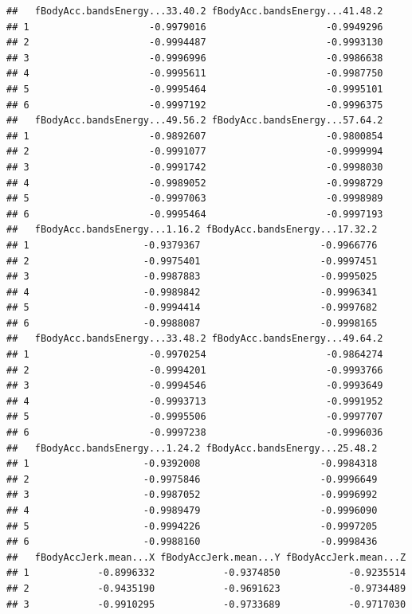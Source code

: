 \documentclass[
]{article}
\begin{document}
\begin{verbatim}
##   fBodyAcc.bandsEnergy...33.40.2 fBodyAcc.bandsEnergy...41.48.2
## 1                     -0.9979016                     -0.9949296
## 2                     -0.9994487                     -0.9993130
## 3                     -0.9996996                     -0.9986638
## 4                     -0.9995611                     -0.9987750
## 5                     -0.9995464                     -0.9995101
## 6                     -0.9997192                     -0.9996375
##   fBodyAcc.bandsEnergy...49.56.2 fBodyAcc.bandsEnergy...57.64.2
## 1                     -0.9892607                     -0.9800854
## 2                     -0.9991077                     -0.9999994
## 3                     -0.9991742                     -0.9998030
## 4                     -0.9989052                     -0.9998729
## 5                     -0.9997063                     -0.9998989
## 6                     -0.9995464                     -0.9997193
##   fBodyAcc.bandsEnergy...1.16.2 fBodyAcc.bandsEnergy...17.32.2
## 1                    -0.9379367                     -0.9966776
## 2                    -0.9975401                     -0.9997451
## 3                    -0.9987883                     -0.9995025
## 4                    -0.9989842                     -0.9996341
## 5                    -0.9994414                     -0.9997682
## 6                    -0.9988087                     -0.9998165
##   fBodyAcc.bandsEnergy...33.48.2 fBodyAcc.bandsEnergy...49.64.2
## 1                     -0.9970254                     -0.9864274
## 2                     -0.9994201                     -0.9993766
## 3                     -0.9994546                     -0.9993649
## 4                     -0.9993713                     -0.9991952
## 5                     -0.9995506                     -0.9997707
## 6                     -0.9997238                     -0.9996036
##   fBodyAcc.bandsEnergy...1.24.2 fBodyAcc.bandsEnergy...25.48.2
## 1                    -0.9392008                     -0.9984318
## 2                    -0.9975846                     -0.9996649
## 3                    -0.9987052                     -0.9996992
## 4                    -0.9989479                     -0.9996090
## 5                    -0.9994226                     -0.9997205
## 6                    -0.9988160                     -0.9998436
##   fBodyAccJerk.mean...X fBodyAccJerk.mean...Y fBodyAccJerk.mean...Z
## 1            -0.8996332            -0.9374850            -0.9235514
## 2            -0.9435190            -0.9691623            -0.9734489
## 3            -0.9910295            -0.9733689            -0.9717030

\end{verbatim}
\end{document}
